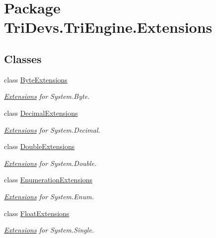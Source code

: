 \hypertarget{namespace_tri_devs_1_1_tri_engine_1_1_extensions}{\section{Package Tri\-Devs.\-Tri\-Engine.\-Extensions}
\label{namespace_tri_devs_1_1_tri_engine_1_1_extensions}
}
\subsection*{Classes}
\begin{DoxyCompactItemize}
\item 
class \hyperlink{class_tri_devs_1_1_tri_engine_1_1_extensions_1_1_byte_extensions}{Byte\-Extensions}
\begin{DoxyCompactList}\small\item\em \hyperlink{namespace_tri_devs_1_1_tri_engine_1_1_extensions}{Extensions} for System.\-Byte. \end{DoxyCompactList}\item 
class \hyperlink{class_tri_devs_1_1_tri_engine_1_1_extensions_1_1_decimal_extensions}{Decimal\-Extensions}
\begin{DoxyCompactList}\small\item\em \hyperlink{namespace_tri_devs_1_1_tri_engine_1_1_extensions}{Extensions} for System.\-Decimal. \end{DoxyCompactList}\item 
class \hyperlink{class_tri_devs_1_1_tri_engine_1_1_extensions_1_1_double_extensions}{Double\-Extensions}
\begin{DoxyCompactList}\small\item\em \hyperlink{namespace_tri_devs_1_1_tri_engine_1_1_extensions}{Extensions} for System.\-Double. \end{DoxyCompactList}\item 
class \hyperlink{class_tri_devs_1_1_tri_engine_1_1_extensions_1_1_enumeration_extensions}{Enumeration\-Extensions}
\begin{DoxyCompactList}\small\item\em \hyperlink{namespace_tri_devs_1_1_tri_engine_1_1_extensions}{Extensions} for System.\-Enum. \end{DoxyCompactList}\item 
class \hyperlink{class_tri_devs_1_1_tri_engine_1_1_extensions_1_1_float_extensions}{Float\-Extensions}
\begin{DoxyCompactList}\small\item\em \hyperlink{namespace_tri_devs_1_1_tri_engine_1_1_extensions}{Extensions} for System.\-Single. \end{DoxyCompactList}\item 

\end{DoxyCompactItemize}
